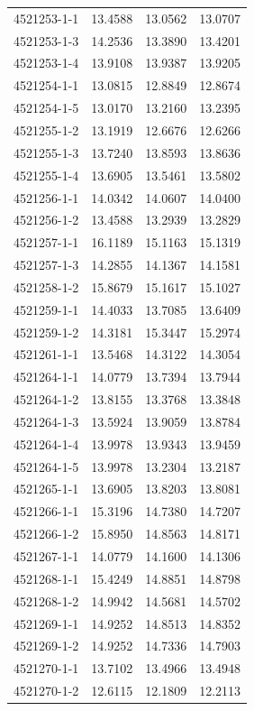 \begin{longtable}{lrrr}
4521253-1-1 & 13.4588 & 13.0562 & 13.0707 \\
4521253-1-3 & 14.2536 & 13.3890 & 13.4201 \\
4521253-1-4 & 13.9108 & 13.9387 & 13.9205 \\
4521254-1-1 & 13.0815 & 12.8849 & 12.8674 \\
4521254-1-5 & 13.0170 & 13.2160 & 13.2395 \\
4521255-1-2 & 13.1919 & 12.6676 & 12.6266 \\
4521255-1-3 & 13.7240 & 13.8593 & 13.8636 \\
4521255-1-4 & 13.6905 & 13.5461 & 13.5802 \\
4521256-1-1 & 14.0342 & 14.0607 & 14.0400 \\
4521256-1-2 & 13.4588 & 13.2939 & 13.2829 \\
4521257-1-1 & 16.1189 & 15.1163 & 15.1319 \\
4521257-1-3 & 14.2855 & 14.1367 & 14.1581 \\
4521258-1-2 & 15.8679 & 15.1617 & 15.1027 \\
4521259-1-1 & 14.4033 & 13.7085 & 13.6409 \\
4521259-1-2 & 14.3181 & 15.3447 & 15.2974 \\
4521261-1-1 & 13.5468 & 14.3122 & 14.3054 \\
4521264-1-1 & 14.0779 & 13.7394 & 13.7944 \\
4521264-1-2 & 13.8155 & 13.3768 & 13.3848 \\
4521264-1-3 & 13.5924 & 13.9059 & 13.8784 \\
4521264-1-4 & 13.9978 & 13.9343 & 13.9459 \\
4521264-1-5 & 13.9978 & 13.2304 & 13.2187 \\
4521265-1-1 & 13.6905 & 13.8203 & 13.8081 \\
4521266-1-1 & 15.3196 & 14.7380 & 14.7207 \\
4521266-1-2 & 15.8950 & 14.8563 & 14.8171 \\
4521267-1-1 & 14.0779 & 14.1600 & 14.1306 \\
4521268-1-1 & 15.4249 & 14.8851 & 14.8798 \\
4521268-1-2 & 14.9942 & 14.5681 & 14.5702 \\
4521269-1-1 & 14.9252 & 14.8513 & 14.8352 \\
4521269-1-2 & 14.9252 & 14.7336 & 14.7903 \\
4521270-1-1 & 13.7102 & 13.4966 & 13.4948 \\
4521270-1-2 & 12.6115 & 12.1809 & 12.2113 \\

\end{longtable}

